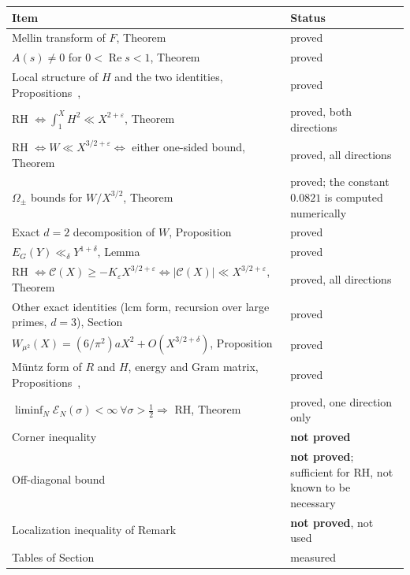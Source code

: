 \documentclass[11pt,reqno]{amsart}
\makeatletter
\let\CG@origref\ref
\let\CG@origeqref\eqref
\newcommand{\CG@gettip}[1]{\@ifundefined{CGTip@#1}{Reference: #1}{\csname CGTip@#1\endcsname}}
\DeclareRobustCommand{\CGref}[1]{\pdftooltip{\CG@origref{#1}}{\CG@gettip{#1}}}
\DeclareRobustCommand{\CGeqref}[1]{\pdftooltip{\CG@origeqref{#1}}{\CG@gettip{#1}}}
\numberwithin{equation}{section}
\theoremstyle{plain}
\theoremstyle{definition}
\theoremstyle{remark}
\makeatother
\begin{document}
\begin{center}
\small
\begin{tabular}{p{}p{}}
\toprule
Item & Status \\
\midrule
Mellin transform of $F$, Theorem~\CGref{thm:mellin} & proved \\
$A(s)\neq0$ for $0<\operatorname{Re}s<1$, Theorem~\CGref{thm:Anonzero} & proved \\
Local structure of $H$ and the two identities, Propositions~\CGref{prop:Hlocal}, \CGref{prop:Hid} & proved \\
RH $\iff\int_1^XH^2\ll X^{2+\varepsilon}$, Theorem~\CGref{thm:L2} & proved, both directions \\
RH $\iff W\ll X^{3/2+\varepsilon}\iff$ either one-sided bound, Theorem~\CGref{thm:Wcrit} & proved, all directions \\
$\Omega_\pm$ bounds for $W/X^{3/2}$, Theorem~\CGref{thm:omega} & proved; the constant $0.0821$ is computed numerically \\
Exact $d=2$ decomposition of $W$, Proposition~\CGref{prop:decomp} & proved \\
$E_G(Y)\ll_\delta Y^{1+\delta}$, Lemma~\CGref{lem:EG} & proved \\
RH $\iff\mathcal C(X)\ge-K_\varepsilon X^{3/2+\varepsilon}\iff|\mathcal C(X)|\ll X^{3/2+\varepsilon}$, Theorem~\CGref{thm:corner} & proved, all directions \\
Other exact identities (lcm form, recursion over large primes, $d=3$), Section~\CGref{sec:other} & proved \\
$W_{\mu^2}(X)=(6/\pi^2)aX^2+O(X^{3/2+\delta})$, Proposition~\CGref{prop:musq} & proved \\
M\"untz form of $R$ and $H$, energy and Gram matrix, Propositions~\CGref{prop:muntz}, \CGref{prop:energy} & proved \\
$\liminf_N\mathcal E_N(\sigma)<\infty\ \forall\sigma>\frac12\Rightarrow$ RH, Theorem~\CGref{thm:energy} & proved, one direction only \\
Corner inequality \CGeqref{eq:target} & \textbf{not proved} \\
Off-diagonal bound \CGeqref{eq:target2} & \textbf{not proved}; sufficient for RH, not known to be necessary \\
Localization inequality of Remark~\CGref{rem:local} & \textbf{not proved}, not used \\
Tables of Section~\CGref{sec:num} & measured \\
\bottomrule
\end{tabular}
\end{center}
\end{document}
